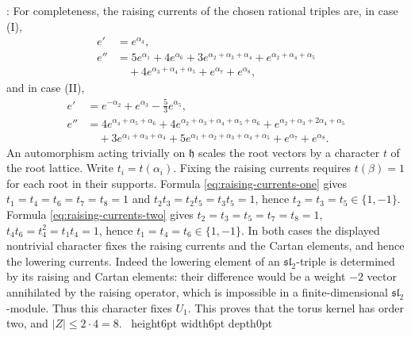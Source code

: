 \documentclass[leqno]{article}
\renewcommand{\leq}{\ensuremath{\leqslant}}
\newcommand{\qed}{\hfill \vrule height6pt  width6pt depth0pt}
\newenvironment{proof}[1][]{\noindent {\it Proof #1} : }{\hbox{~}\qed
\smallskip
}
\numberwithin{equation}{section}
\begin{document}
\begin{proof}
For completeness, the raising currents of the chosen rational triples are, in case (I),
\begin{equation}
\label{eq:raising-currents-one}
\begin{aligned}
e' &= e^{\alpha_4},\\
e'' &= 5e^{\alpha_1}+4e^{\alpha_6}+3e^{\alpha_2+\alpha_3+\alpha_4}
+e^{\alpha_2+\alpha_4+\alpha_5}\\
&\quad +4e^{\alpha_3+\alpha_4+\alpha_5}+e^{\alpha_7}+e^{\alpha_8},
\end{aligned}
\end{equation}
and in case (II),
\begin{equation}
\label{eq:raising-currents-two}
\begin{aligned}
e' &= e^{-\alpha_2}+e^{\alpha_3}-\tfrac53e^{\alpha_5},\\
e'' &= 4e^{\alpha_4+\alpha_5+\alpha_6}+4e^{\alpha_2+\alpha_3+\alpha_4+\alpha_5+\alpha_6}
+e^{\alpha_2+\alpha_3+2\alpha_4+\alpha_5}\\
&\quad +3e^{\alpha_1+\alpha_3+\alpha_4}+5e^{\alpha_1+\alpha_2+\alpha_3+\alpha_4+\alpha_5}
+e^{\alpha_7}+e^{\alpha_8}.
\end{aligned}
\end{equation}
An automorphism acting trivially on $\mathfrak h$ scales the root vectors by a character $t$ of the root lattice. Write $t_i = t(\alpha_i)$. Fixing the raising currents requires $t(\beta) = 1$ for each root in their supports. Formula \eqref{eq:raising-currents-one} gives $t_1 = t_4 = t_6 = t_7 = t_8 = 1$ and $t_2t_3 = t_2t_5 = t_3t_5 = 1$, hence $t_2 = t_3 = t_5 \in \{1,-1\}$. Formula \eqref{eq:raising-currents-two} gives $t_2 = t_3 = t_5 = t_7 = t_8 = 1$, $t_4t_6 = t_4^2 = t_1t_4 = 1$, hence $t_1 = t_4 = t_6 \in \{1,-1\}$. In both cases the displayed nontrivial character fixes the raising currents and the Cartan elements, and hence the lowering currents. Indeed the lowering element of an $\mathfrak{sl}_2$-triple is determined by its raising and Cartan elements: their difference would be a weight $-2$ vector annihilated by the raising operator, which is impossible in a finite-dimensional $\mathfrak{sl}_2$-module. Thus this character fixes $U_1$. This proves that the torus kernel has order two, and $|Z| \leq 2 \cdot 4 = 8$.
\end{proof}
\end{document}
